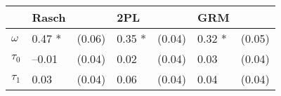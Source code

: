 \begin{tabular}{lllllll}
  \hline
  & Rasch &  & 2PL &  & GRM &  \\ 
   \hline
$\omega$ & 0.47 * & (0.06) & 0.35 * & (0.04) & 0.32 * & (0.05) \\ 
  $\tau_0$ & --0.01 & (0.04) & 0.02 & (0.04) & 0.03 & (0.04) \\ 
  $\tau_1$ & 0.03 & (0.04) & 0.06 & (0.04) & 0.04 & (0.04) \\ 
   \hline
\end{tabular}
